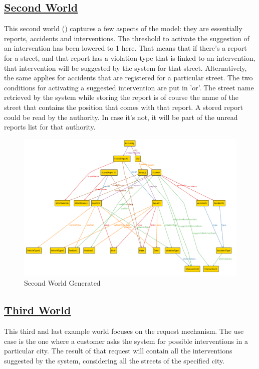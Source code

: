 	\subsection[Second World]{\hyperlink{toc}{Second World}}
	This second world () captures a few aspects of the model: they are essentially reports, accidents and interventions. The threshold to activate the suggestion of an intervention has been lowered to 1 here. That means that if there's a report for a street, and that report has a violation type that is linked to an intervention, that intervention will be suggested by the system for that street. Alternatively, the same applies for accidents that are registered for a particular street. The two conditions for activating a suggested intervention are put in 'or'.
	The street name retrieved by the system while storing the report is of course the name of the street that contains the position that comes with that report.
	A stored report could be read by the authority. In case it's not, it will be part of the unread reports list for that authority.
	
	\begin{figure}[hbtp]
		\centering
		\includegraphics[scale=0.4, angle=90]{Files/alloy/world2.png}
		\caption{\label{fig:secondWorld}Second World Generated}
	\end{figure}
	
	\FloatBarrier
	\subsection[Third World]{\hyperlink{toc}{Third World}}
	This third and last example world focuses on the request mechanism. The use case is the one where a customer asks the system for possible interventions in a particular city. The result of that request will contain all the interventions suggested by the system, considering all the streets of the specified city.
	

